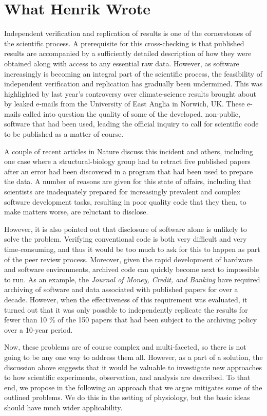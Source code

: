 \section*{What Henrik Wrote}

Independent verification and replication of results is one of the cornerstones
of the scientific process. A prerequisite for this cross-checking is that
published results are accompanied by a sufficiently detailed description of
how they were obtained along with access to any essential raw data. However,
as software increasingly is becoming an integral part of the scientific
process, the feasibility of independent verification and replication has
gradually been undermined. This was highlighted by last year's controversy
over climate-science results brought about by leaked e-mails from the
University of East Anglia in Norwich, UK. These e-mails called into question
the quality of some of the developed, non-public, software that had been used,
leading the official inquiry to call for scientific code to be published
as a matter of course.

A couple of recent articles in Nature \cite{Merali2010, Barnes2010} discuss this incident 
and others, including one case where a structural-biology group had to
retract five published papers after an error had been discovered in a program
that had been used to prepare the data. A number of reasons are given for
this state of affairs, including that scientists are inadequately prepared for
increasingly prevalent and complex software development tasks, resulting
in poor quality code that they then, to make matters worse, are reluctant to
disclose.

However, it is also pointed out that disclosure of software alone is unlikely
to solve the problem. Verifying conventional code is both very difficult and
very time-consuming, and thus it would be too much to ask for this to happen
as part of the peer review process. Moreover, given the rapid development of
hardware and software environments, archived code can quickly become next to
impossible to run. As an example, the \textit{Journal of Money, Credit, and
Banking} have required archiving of software and data associated with
published papers for over a decade. However, when the effectiveness of this
requirement was evaluated, it turned out that it was only possible to
independently replicate the results for fewer than 10 \% of the 150 papers
that had been subject to the archiving policy over a 10-year period.

Now, these problems are of course complex and multi-faceted, so there is not
going to be any one way to address them all. However, as a part of a solution,
the discussion above suggests that it would be valuable to investigate new
approaches to how scientific experiments, observation, and analysis are
described. To that end, we propose in the following an approach that we argue
mitigates some of the outlined problems. We do this in the setting of
physiology, but the basic ideas should have much wider applicability.

